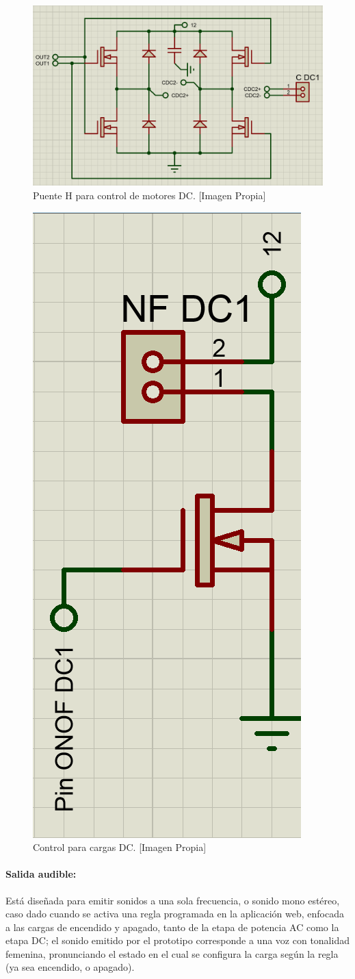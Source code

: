 		\begin{figure}[H]
			\centering
			\caption[Puente H para control de motores DC.]{Puente H para control de motores DC. [Imagen Propia]}
			\label{fig:CDC}
			\includegraphics[width=0.7\linewidth]{Imagenes/CDC}
		\end{figure}
	
		\begin{figure}[H]
			\centering
			\caption[Control para cargas DC.]{Control para cargas DC. [Imagen Propia]}
			\label{fig:ONOFDC}
			\includegraphics[width=0.25\linewidth]{Imagenes/ONOFDC}
		\end{figure}
	
	\paragraph{Salida audible:}
		Está diseñada para emitir sonidos a una sola frecuencia, o sonido mono estéreo, caso dado cuando se activa una regla programada en la aplicación web, enfocada a las cargas de encendido y apagado, tanto de la etapa de potencia AC como la etapa DC; el sonido emitido por el prototipo corresponde a una voz con tonalidad femenina, pronunciando el estado en el cual se configura la carga según la regla (ya sea encendido, o apagado).\\
		
